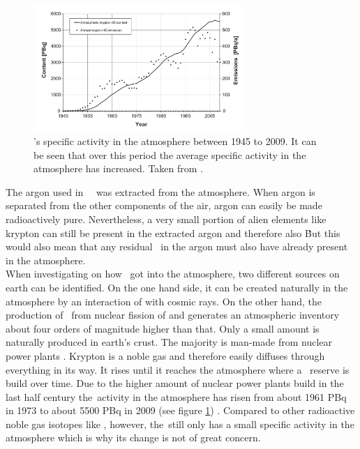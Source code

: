 \documentclass[encoding=utf8,british]{tumphthesis}
\begin{document}
\begin{figure}[t!]
	\centering
	\ifmakefigures%
	\includegraphics[width=80mm]{./Bilder/Kr85Aenderung.png}
	\fi%
	\caption{
	    \Kr's specific activity in the atmosphere between 1945 to 2009. It can be seen that over this period the average specific activity in the atmosphere has increased. 
		Taken from \cite{ahlswede_update_2013}.
	}
    \label{fig:Kr85Aenderung}
\end{figure}

The argon used in \gerda\ \PII\ was extracted from the atmosphere.
When argon is separated from the other components of the air, argon can easily be made radioactively pure.
Nevertheless, a very small portion of alien elements like krypton can still be present in the extracted argon and therefore also \Kr\.  
But this would also mean that any residual \Kr\ in the argon must also have already present in the atmosphere.
\\

When investigating on how  \Kr\ got into the atmosphere, two different sources on earth can be identified.
On the one hand side, it can be created naturally in the atmosphere by an interaction of  with cosmic rays.
On the other hand, the production of \Kr\ from nuclear fission of  and  generates an atmospheric inventory about four orders of magnitude higher than that.
Only a small amount is naturally produced in earth's crust.
The majority is man-made from nuclear power plants \cite{winger_new_2005}.
Krypton is a noble gas and therefore easily diffuses through everything in its way.
It rises until it reaches the atmosphere where a \Kr\ reserve is build over time.  
Due to the higher amount of nuclear power plants build in the last half century the\Kr\ activity in the atmosphere has risen from about 1961 PBq in 1973 \cite{telegadas_atmospheric_1975} to about 5500 PBq in 2009 (see figure \ref{fig:Kr85Aenderung}) \cite{ahlswede_update_2013}.
Compared to other radioactive noble gas isotopes like , however, the\Kr\ still only has a small specific activity in the atmosphere which is why its change is not of great concern.
\\
\end{document}
